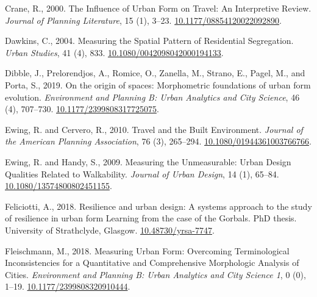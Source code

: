 \documentclass[
  10pt,
]{article}
\newlength{\cslhangindent}
\newenvironment{CSLReferences}[2] %
 {%
  \setlength{\parindent}{0pt}
  \ifodd #1 \everypar{\setlength{\hangindent}{\cslhangindent}}\ignorespaces\fi
  \ifnum #2 > 0
  \setlength{\parskip}{#2\baselineskip}
  \fi
 }%
 {}
\begin{document}
\begin{CSLReferences}{1}{0}
\leavevmode{}%
Crane, R., 2000. The {Influence} of {Urban Form} on {Travel}: {An
Interpretive Review}. \emph{Journal of Planning Literature}, 15 (1),
3--23.
\href{https://doi.org/10.1177/08854120022092890}{10.1177/08854120022092890}.

\leavevmode{}%
Dawkins, C., 2004. Measuring the {Spatial Pattern} of {Residential
Segregation}. \emph{Urban Studies}, 41 (4), 833.
\href{https://doi.org/10.1080/0042098042000194133}{10.1080/0042098042000194133}.

\leavevmode{}%
Dibble, J., Prelorendjos, A., Romice, O., Zanella, M., Strano, E.,
Pagel, M., and Porta, S., 2019. On the origin of spaces: {Morphometric}
foundations of urban form evolution. \emph{Environment and Planning B:
Urban Analytics and City Science}, 46 (4), 707--730.
\href{https://doi.org/10.1177/2399808317725075}{10.1177/2399808317725075}.

\leavevmode{}%
Ewing, R. and Cervero, R., 2010. Travel and the {Built Environment}.
\emph{Journal of the American Planning Association}, 76 (3), 265--294.
\href{https://doi.org/10.1080/01944361003766766}{10.1080/01944361003766766}.

\leavevmode{}%
Ewing, R. and Handy, S., 2009. Measuring the {Unmeasurable}: {Urban
Design Qualities Related} to {Walkability}. \emph{Journal of Urban
Design}, 14 (1), 65--84.
\href{https://doi.org/10.1080/13574800802451155}{10.1080/13574800802451155}.

\leavevmode{}%
Feliciotti, A., 2018. {Resilience and urban design}: {A systems approach
to the study of resilience in urban form \textendash{} Learning from the
case of the Gorbals}. PhD thesis. University of Strathclyde, {Glasgow}.
\href{https://doi.org/10.48730/yrsa-7747}{10.48730/yrsa-7747}.

\leavevmode{}%
Fleischmann, M., 2018. Measuring {Urban Form}: {Overcoming
Terminological Inconsistencies} for a {Quantitative} and {Comprehensive
Morphologic Analysis} of {Cities}. \emph{Environment and Planning B:
Urban Analytics and City Science 1}, 0 (0), 1--19.
\href{https://doi.org/10.1177/2399808320910444}{10.1177/2399808320910444}.


\end{CSLReferences}
\end{document}

